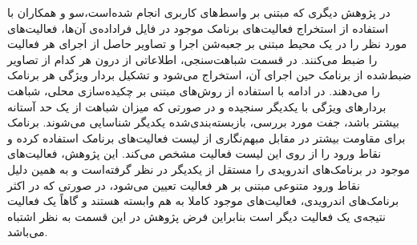 در پژوهش دیگری که مبتنی بر واسط‌های کاربری انجام‌ شده‌است،سو و همکاران با استفاده از استخراج فعالیت‌های برنامک موجود در فایل‌ فراداده‌ی آن‌ها، فعالیت‌های مورد نظر را در یک محیط مبتنی بر جعبه‌شن اجرا و تصاویر حاصل از اجرای هر فعالیت را ضبط می‌کنند. در قسمت شباهت‌سنجی، اطلاعاتی از درون هر کدام از تصاویر ضبط‌شده از برنامک حین اجرای آن‌، استخراج می‌شود و تشکیل بردار ویژگی هر برنامک را می‌دهند. در ادامه با استفاده از روش‌های مبتنی بر چکیده‌سازی محلی‌، شباهت بردار‌های ویژگی با یکدیگر سنجیده و در صورتی که میزان شباهت از یک حد آستانه بیشتر باشد، جفت مورد بررسی، بازبسته‌بندی‌شده‌ یکدیگر شناسایی می‌شوند. برنامک برای مقاومت بیشتر در مقابل مبهم‌نگاری از لیست فعالیت‌های برنامک استفاده کرده و نقاط ورود‌ را از روی این لیست فعالیت مشخص می‌کند. این پژوهش، فعالیت‌های موجود در برنامک‌های اندرویدی را مستقل از یکدیگر در نظر گرفته‌است و به همین دلیل نقاط ورود متنوعی مبتنی بر هر فعالیت تعیین می‌شود، در صورتی که در اکثر برنامک‌های اندرویدی، فعالیت‌های موجود کاملا به هم وابسته هستند و گاهاً یک فعالیت نتیجه‌ی یک فعالیت دیگر است بنابراین فرض پژوهش در این قسمت به نظر اشتباه می‌باشد.

